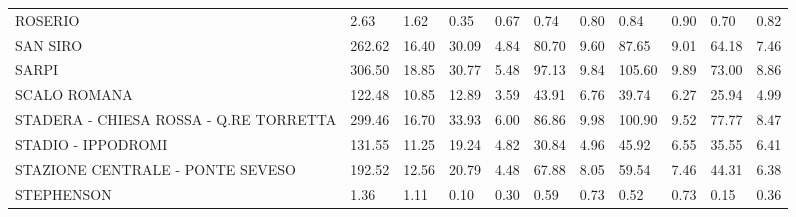 \begin{table}[H]
{{\begin{tabular}{lp{1.3cm}p{1.3cm}p{1.3cm}p{1.3cm}p{1.3cm}p{1.3cm}p{1.3cm}p{1.3cm}p{1.3cm}p{1.3cm}}
ROSERIO                                            &                      2.63 &                  1.62 &                        0.35 &                    0.67 &                        0.74 &                    0.80 &                        0.84 &                    0.90 &                      0.70 &                  0.82 \\
SAN SIRO                                           &                    262.62 &                 16.40 &                       30.09 &                    4.84 &                       80.70 &                    9.60 &                       87.65 &                    9.01 &                     64.18 &                  7.46 \\
SARPI                                              &                    306.50 &                 18.85 &                       30.77 &                    5.48 &                       97.13 &                    9.84 &                      105.60 &                    9.89 &                     73.00 &                  8.86 \\
SCALO ROMANA                                       &                    122.48 &                 10.85 &                       12.89 &                    3.59 &                       43.91 &                    6.76 &                       39.74 &                    6.27 &                     25.94 &                  4.99 \\
STADERA - CHIESA ROSSA - Q.RE TORRETTA  &                    299.46 &                 16.70 &                       33.93 &                    6.00 &                       86.86 &                    9.98 &                      100.90 &                    9.52 &                     77.77 &                  8.47 \\
STADIO - IPPODROMI                                 &                    131.55 &                 11.25 &                       19.24 &                    4.82 &                       30.84 &                    4.96 &                       45.92 &                    6.55 &                     35.55 &                  6.41 \\
STAZIONE CENTRALE - PONTE SEVESO                   &                    192.52 &                 12.56 &                       20.79 &                    4.48 &                       67.88 &                    8.05 &                       59.54 &                    7.46 &                     44.31 &                  6.38 \\
STEPHENSON                                         &                      1.36 &                  1.11 &                        0.10 &                    0.30 &                        0.59 &                    0.73 &                        0.52 &                    0.73 &                      0.15 &                  0.36 \\

\end{tabular}}}
\end{table}
